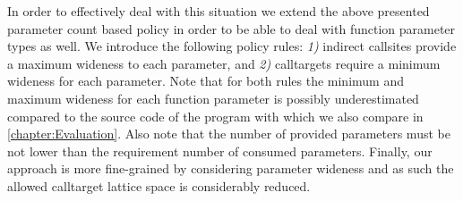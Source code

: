 In order to effectively deal with this situation we extend the above presented parameter count based policy in order to
be able to deal with function parameter types as well. We introduce the following policy rules: 
\textit{1)} indirect callsites provide a maximum wideness to each parameter, and
\textit{2)} calltargets require a minimum wideness for each parameter. 
Note that for both rules the minimum and maximum wideness for each function 
parameter is possibly underestimated compared to the source code of the program with which we 
also compare in \cref{chapter:Evaluation}.
Also note that the number of provided parameters must be not lower than the requirement number of consumed parameters. 
Finally, our approach is more fine-grained by considering parameter wideness and as such the allowed calltarget lattice 
space is considerably reduced.



